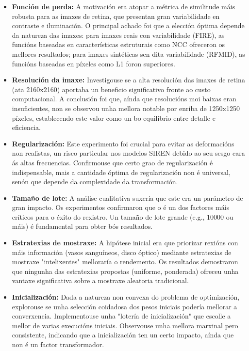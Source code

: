 \begin{itemize}
\item \textbf{Función de perda:} A motivación era atopar a métrica de similitude máis robusta para as imaxes de retina, que presentan gran variabilidade en contraste e iluminación. O principal achado foi que a elección óptima depende da natureza das imaxes: para imaxes reais con variabilidade (FIRE), as funcións baseadas en características estruturais como NCC ofreceron os mellores resultados; para imaxes sintéticas sen dita variabilidade (RFMID), as funcións baseadas en píxeles como L1 foron superiores.

\item \textbf{Resolución da imaxe:} Investigouse se a alta resolución das imaxes de retina (ata 2160x2160) aportaba un beneficio significativo fronte ao custo computacional. A conclusión foi que, aínda que resolucións moi baixas eran insuficientes, non se observou unha mellora notable por enriba de 1250x1250 píxeles, establecendo este valor como un bo equilibrio entre detalle e eficiencia.

\item \textbf{Regularización:} Este experimento foi crucial para evitar as deformacións non realistas, un risco particular nos modelos SIREN debido ao seu sesgo cara ás altas frecuencias. Confirmouse que certo grao de regularización é indispensable, mais a cantidade óptima de regularización non é universal, senón que depende da complexidade da transformación.

\item \textbf{Tamaño de lote:} A análise cualitativa suxería que este era un parámetro de gran impacto. Os experimentos confirmaron que o é un dos factores máis críticos para o éxito do rexistro. Un tamaño de lote grande (e.g., 10000 ou máis) é fundamental para obter bós resultados.

\item \textbf{Estratexias de mostraxe:} A hipótese inicial era que priorizar rexións con máis información (vasos sanguíneos, disco óptico) mediante estratexias de mostraxe "intelixentes" melloraría o rendemento. Os resultados demostraron que ningunha das estratexias propostas (uniforme, ponderada) ofreceu unha vantaxe significativa sobre a mostraxe aleatoria tradicional.

\item \textbf{Inicialización:} Dada a natureza non convexa do problema de optimización, explorouse se unha selección coidadosa dos pesos iniciais podería mellorar a converxencia. Implementouse unha "lotería de inicialización" que escolle a mellor de varias execucións iniciais. Observouse unha mellora marxinal pero consistente, indicando que a inicialización ten un certo impacto, aínda que non é un factor transformador.


\end{itemize}
